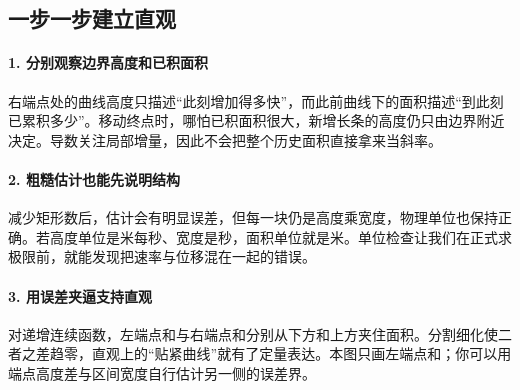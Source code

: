 \subsection*{一步一步建立直观}

\paragraph{1. 分别观察边界高度和已积面积}

右端点处的曲线高度只描述“此刻增加得多快”，而此前曲线下的面积描述“到此刻已累积多少”。移动终点时，哪怕已积面积很大，新增长条的高度仍只由边界附近决定。导数关注局部增量，因此不会把整个历史面积直接拿来当斜率。



\paragraph{2. 粗糙估计也能先说明结构}

减少矩形数后，估计会有明显误差，但每一块仍是高度乘宽度，物理单位也保持正确。若高度单位是米每秒、宽度是秒，面积单位就是米。单位检查让我们在正式求极限前，就能发现把速率与位移混在一起的错误。



\paragraph{3. 用误差夹逼支持直观}

对递增连续函数，左端点和与右端点和分别从下方和上方夹住面积。分割细化使二者之差趋零，直观上的“贴紧曲线”就有了定量表达。本图只画左端点和；你可以用端点高度差与区间宽度自行估计另一侧的误差界。
